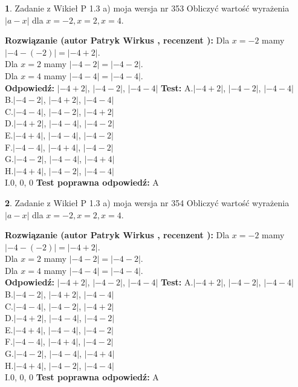 \documentclass[12pt, a4paper]{article}
\theoremstyle{definition} %
\newtheorem{zad}{}
\newcommand{\zadStart}[1]{\begin{zad}#1\newline}
\newcommand{\zadStop}{\end{zad}}
\newcommand{\rozwStart}[2]{\noindent \textbf{Rozwiązanie (autor #1 , recenzent #2): }\newline}
\newcommand{\rozwStop}{\newline}
\newcommand{\odpStart}{\noindent \textbf{Odpowiedź:}\newline}
\newcommand{\odpStop}{\newline}
\newcommand{\testStart}{\noindent \textbf{Test:}\newline}
\newcommand{\testStop}{\newline}
\newcommand{\kluczStart}{\noindent \textbf{Test poprawna odpowiedź:}\newline}
\newcommand{\kluczStop}{\newline}
\begin{document}
\zadStart{Zadanie z Wikieł P 1.3 a) moja wersja nr 353}
Obliczyć wartość wyrażenia $|a - x|$ dla $x=-2,x=2,x=4$.
\zadStop
\rozwStart{Patryk Wirkus}{}
Dla $x = -2$ mamy $|-4 - (-2)| = |-4 + 2|$.\\
Dla $x = 2$ mamy $|-4 - 2| = |-4 - 2|$.\\
Dla $x = 4$ mamy $|-4 - 4| = |-4 - 4|$.\\
\rozwStop
\odpStart
$|-4 + 2|$, $|-4 - 2|$, $|-4 - 4|$
\odpStop
\testStart
A.$|-4 + 2|$, $|-4 - 2|$, $|-4 - 4|$\\
B.$|-4 - 2|$, $|-4 + 2|$, $|-4 - 4|$\\
C.$|-4 - 4|$, $|-4 - 2|$, $|-4 + 2|$\\
D.$|-4 + 2|$, $|-4 - 4|$, $|-4 - 2|$\\
E.$|-4 + 4|$, $|-4 - 4|$, $|-4 - 2|$\\
F.$|-4 - 4|$, $|-4 + 4|$, $|-4 - 2|$\\
G.$|-4 - 2|$, $|-4 - 4|$, $|-4 + 4|$\\
H.$|-4 + 4|$, $|-4 - 2|$, $|-4 - 4|$\\
I.$0$, $0$, $0$
\testStop
\kluczStart
A
\kluczStop



\zadStart{Zadanie z Wikieł P 1.3 a) moja wersja nr 354}
Obliczyć wartość wyrażenia $|a - x|$ dla $x=-2,x=2,x=4$.
\zadStop
\rozwStart{Patryk Wirkus}{}
Dla $x = -2$ mamy $|-4 - (-2)| = |-4 + 2|$.\\
Dla $x = 2$ mamy $|-4 - 2| = |-4 - 2|$.\\
Dla $x = 4$ mamy $|-4 - 4| = |-4 - 4|$.\\
\rozwStop
\odpStart
$|-4 + 2|$, $|-4 - 2|$, $|-4 - 4|$
\odpStop
\testStart
A.$|-4 + 2|$, $|-4 - 2|$, $|-4 - 4|$\\
B.$|-4 - 2|$, $|-4 + 2|$, $|-4 - 4|$\\
C.$|-4 - 4|$, $|-4 - 2|$, $|-4 + 2|$\\
D.$|-4 + 2|$, $|-4 - 4|$, $|-4 - 2|$\\
E.$|-4 + 4|$, $|-4 - 4|$, $|-4 - 2|$\\
F.$|-4 - 4|$, $|-4 + 4|$, $|-4 - 2|$\\
G.$|-4 - 2|$, $|-4 - 4|$, $|-4 + 4|$\\
H.$|-4 + 4|$, $|-4 - 2|$, $|-4 - 4|$\\
I.$0$, $0$, $0$
\testStop
\kluczStart
A
\kluczStop
\end{document}
